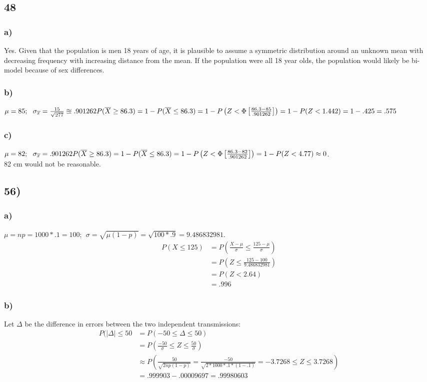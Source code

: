 \documentclass{article}
\begin{document}
	\subsection*{48}
		\subsubsection*{a)}
			Yes. Given that the population is men 18 years of age, it is plausible to assume a symmetric distribution around an unknown mean with decreasing frequency with increasing distance from the mean. If the population were all 18 year olds, the population would likely be bi-model because of sex differences.
		\subsubsection*{b)}		
			$\mu = 85; ~~ \sigma_{\overline{x}} = \frac{15}{\sqrt{277}} \approxeq .901262\\ 
			P(\overline{X} \geq 86.3) = 1- P(\overline{X} \leq 86.3) = 1- P \left(Z < \Phi \left [ \frac{86.3 - 85}{.901262} \right ] \right) = 1- P(Z < 1.442) = 1- .425 = .575
			$
		\subsubsection*{c)}
			$\mu = 82; ~~ \sigma_{\overline{x}} = .901262\\ 
			P(\overline{X} \geq 86.3) = 1- P(\overline{X} \leq 86.3) = 1- P \left(Z < \Phi \left [ \frac{86.3 - 82}{.901262} \right ] \right) = 1- P(Z < 4.77) \approx 0
			$. \\ 82 cm would not be reasonable.
	\subsection*{56)}
		\subsubsection*{a)}
			$ \mu = np = 1000 *.1 = 100; ~~ \sigma = \sqrt{\mu(1-p)} = \sqrt{100*.9} = 9.486832981.$
			\begin{align*}
				P(X \leq 125) &= P \left ( \frac{X - \mu}{\sigma} \leq \frac{125 - \mu}{\sigma} \right ) \\
				&= P \left ( Z \leq \frac{125-100}{9.486832981} \right ) \\
				&= P(Z < 2.64) \\
				&= .996		
			\end{align*}
		\subsubsection*{b)}
			Let $\Delta$ be the difference in errors between the two independent transmissions:
			\begin{align*}
				P(|\Delta| \leq 50 &= P(-50 \leq \Delta \leq 50) \\
				&= P \left ( \frac{-50}{\sigma} \leq Z \leq \frac{50}{\sigma} \right ) \\
				& \approx P \left ( \frac{50}{\sqrt{2np(1-p)}} = \frac{-50}{\sqrt{2*1000*.1*(1-.1)}} = -3.7268 \leq Z \leq 3.7268 \right ) \\
				&= .999903 - .00009697 = .99980603			
			\end{align*}
\end{document}
